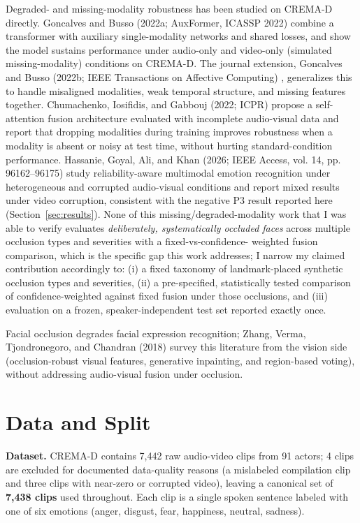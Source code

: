 \documentclass[10pt]{article}
\begin{document}
Degraded- and missing-modality robustness has been studied on CREMA-D directly. Goncalves and Busso
(2022a; AuxFormer, ICASSP 2022) \citep{goncalves2022auxformer} combine a transformer with auxiliary single-modality networks and
shared losses, and show the model sustains performance under audio-only and video-only (simulated
missing-modality) conditions on CREMA-D. The journal extension, Goncalves and Busso (2022b; IEEE
Transactions on Affective Computing) \citep{goncalves2022robust}, generalizes this to handle misaligned modalities, weak temporal
structure, and missing features together. Chumachenko, Iosifidis, and Gabbouj (2022; ICPR) \citep{chumachenko2022selfattention} propose a
self-attention fusion architecture evaluated with incomplete audio-visual data and report that dropping
modalities during training improves robustness when a modality is absent or noisy at test time, without
hurting standard-condition performance. Hassanie, Goyal, Ali, and Khan (2026; IEEE Access, vol. 14, pp.
96162--96175) \citep{hassanie2026reliability} study reliability-aware multimodal emotion recognition under heterogeneous and corrupted
audio-visual conditions and report mixed results under video corruption, consistent with the negative
P3 result reported here (Section~\ref{sec:results}).
None of this missing/degraded-modality work that I was able to verify evaluates \emph{deliberately,
systematically occluded faces} across multiple occlusion types and severities with a fixed-vs-confidence-
weighted fusion comparison, which is the specific gap this work addresses; I narrow my claimed
contribution accordingly to: (i) a fixed taxonomy of landmark-placed synthetic occlusion types and
severities, (ii) a pre-specified, statistically tested comparison of confidence-weighted against fixed
fusion under those occlusions, and (iii) evaluation on a frozen, speaker-independent test set reported
exactly once.

Facial occlusion degrades facial expression recognition; Zhang, Verma, Tjondronegoro, and Chandran
(2018) \citep{zhang2018facial} survey this literature from the vision side (occlusion-robust visual features, generative
inpainting, and region-based voting), without addressing audio-visual fusion under occlusion.

\section{Data and Split}

\textbf{Dataset.} CREMA-D contains 7,442 raw audio-video clips from 91 actors; 4 clips are excluded for
documented data-quality reasons (a mislabeled compilation clip and three clips with near-zero or
corrupted video), leaving a canonical set of \textbf{7,438 clips} used throughout. Each clip is a single
spoken sentence labeled with one of six emotions (anger, disgust, fear, happiness, neutral, sadness).
\end{document}
